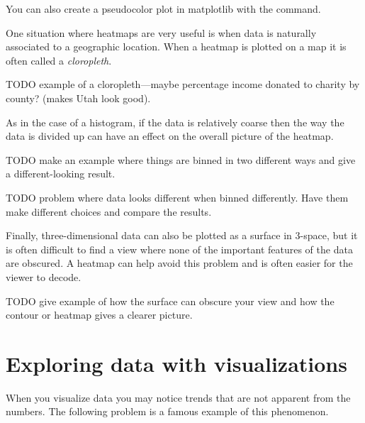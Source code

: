 You can also create a pseudocolor plot in matplotlib with the  command.


One situation where heatmaps are very useful is when data is naturally associated to a geographic location.  When a heatmap is plotted on a map it is often called a \emph{cloropleth}.

TODO example of a cloropleth---maybe percentage income donated to charity by county? (makes Utah look good).

As in the case of a histogram, if the data is relatively coarse then the way the data is divided up can have an effect on the overall picture of the heatmap.

TODO make an example where things are binned in two different ways  and give a different-looking result.

\begin{problem}
TODO problem where data looks different when binned differently.  Have them make different choices and compare the results.
\end{problem}



Finally, three-dimensional data can also be plotted as a surface in 3-space, but it is often difficult to find a view where none of the important features of the data are obscured.
A heatmap can help avoid this problem and is often easier for the viewer to decode.

TODO give example of how the surface can obscure your view and how the contour or heatmap gives a clearer picture.


\section*{Exploring data with visualizations}
When you visualize data you may notice trends that are not apparent from the numbers. 
The following problem is a famous example of this phenomenon.

